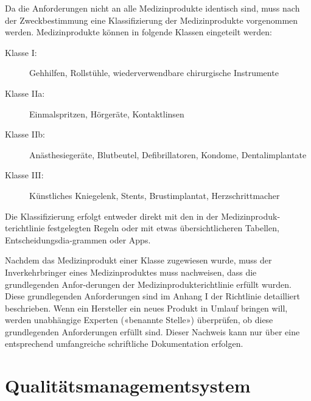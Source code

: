 Da die Anforderungen nicht an alle Medizinprodukte identisch sind, muss nach der Zweckbestimmung eine Klassifizierung der Medizinprodukte vorgenommen werden. Medizinprodukte können in folgende Klassen eingeteilt werden:
\begin{description}
	\item[Klasse I:] Gehhilfen, Rollstühle, wiederverwendbare chirurgische Instrumente
	\item[Klasse IIa:] Einmalspritzen, Hörgeräte, Kontaktlinsen
	\item[Klasse IIb:] Anästhesiegeräte, Blutbeutel, Defibrillatoren, Kondome, Dentalimplantate
	\item[Klasse III:] Künstliches Kniegelenk, Stents, Brustimplantat, Herzschrittmacher
\end{description}
Die Klassifizierung erfolgt entweder direkt mit den in der Medizinproduk-terichtlinie festgelegten Regeln oder mit etwas übersichtlicheren Tabellen, Entscheidungsdia-grammen oder Apps.

Nachdem das Medizinprodukt einer Klasse zugewiesen wurde, muss der Inverkehrbringer eines Medizinproduktes muss nachweisen, dass die grundlegenden Anfor-derungen der Medizinprodukterichtlinie erfüllt wurden. Diese grundlegenden Anforderungen sind im Anhang I der Richtlinie detailliert beschrieben. Wenn ein Hersteller ein neues Produkt in Umlauf bringen will, werden unabhängige Experten («benannte Stelle») überprüfen, ob diese grundlegenden Anforderungen erfüllt sind. Dieser Nachweis kann nur über eine entsprechend umfangreiche schriftliche Dokumentation erfolgen.

\section{Qualitätsmanagementsystem}

